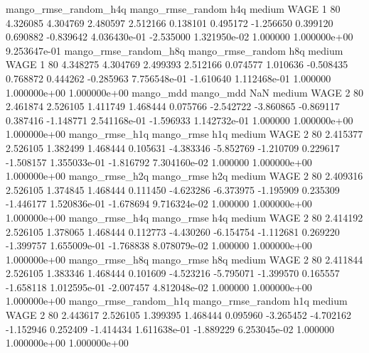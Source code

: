 mango_rmse_random_h4q mango_rmse_random                  h4q     medium     WAGE                 1 80  4.326085       4.304769 2.480597       2.512166    0.138101      0.495172     -1.256650     0.399120       0.690882 -0.839642 4.036430e-01    -2.535000   1.321950e-02            1.000000    1.000000e+00        9.253647e-01
mango_rmse_random_h8q mango_rmse_random                  h8q     medium     WAGE                 1 80  4.348275       4.304769 2.499393       2.512166    0.074577      1.010636     -0.508435     0.768872       0.444262 -0.285963 7.756548e-01    -1.610640   1.112468e-01            1.000000    1.000000e+00        1.000000e+00
            mango_mdd         mango_mdd                  NaN     medium     WAGE                 2 80  2.461874       2.526105 1.411749       1.468444    0.075766     -2.542722     -3.860865    -0.869117       0.387416 -1.148771 2.541168e-01    -1.596933   1.142732e-01            1.000000    1.000000e+00        1.000000e+00
       mango_rmse_h1q        mango_rmse                  h1q     medium     WAGE                 2 80  2.415377       2.526105 1.382499       1.468444    0.105631     -4.383346     -5.852769    -1.210709       0.229617 -1.508157 1.355033e-01    -1.816792   7.304160e-02            1.000000    1.000000e+00        1.000000e+00
       mango_rmse_h2q        mango_rmse                  h2q     medium     WAGE                 2 80  2.409316       2.526105 1.374845       1.468444    0.111450     -4.623286     -6.373975    -1.195909       0.235309 -1.446177 1.520836e-01    -1.678694   9.716324e-02            1.000000    1.000000e+00        1.000000e+00
       mango_rmse_h4q        mango_rmse                  h4q     medium     WAGE                 2 80  2.414192       2.526105 1.378065       1.468444    0.112773     -4.430260     -6.154754    -1.112681       0.269220 -1.399757 1.655009e-01    -1.768838   8.078079e-02            1.000000    1.000000e+00        1.000000e+00
       mango_rmse_h8q        mango_rmse                  h8q     medium     WAGE                 2 80  2.411844       2.526105 1.383346       1.468444    0.101609     -4.523216     -5.795071    -1.399570       0.165557 -1.658118 1.012595e-01    -2.007457   4.812048e-02            1.000000    1.000000e+00        1.000000e+00
mango_rmse_random_h1q mango_rmse_random                  h1q     medium     WAGE                 2 80  2.443617       2.526105 1.399395       1.468444    0.095960     -3.265452     -4.702162    -1.152946       0.252409 -1.414434 1.611638e-01    -1.889229   6.253045e-02            1.000000    1.000000e+00        1.000000e+00

